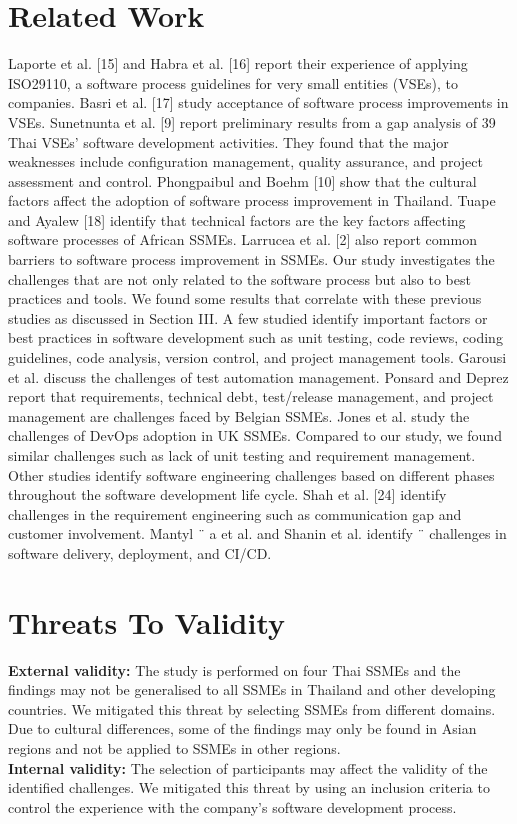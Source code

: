 \documentclass[conference]{IEEEtran}
\begin{document}
\section{Related Work}
Laporte et al. [15] and Habra et al. [16] report their experience of applying ISO29110, a software process guidelines
for very small entities (VSEs), to companies. Basri et al. [17]
study acceptance of software process improvements in VSEs.
Sunetnunta et al. [9] report preliminary results from a gap
analysis of 39 Thai VSEs’ software development activities.
They found that the major weaknesses include configuration
management, quality assurance, and project assessment and
control. Phongpaibul and Boehm [10] show that the cultural
factors affect the adoption of software process improvement
in Thailand. Tuape and Ayalew [18] identify that technical
factors are the key factors affecting software processes of
African SSMEs. Larrucea et al. [2] also report common
barriers to software process improvement in SSMEs. Our study
investigates the challenges that are not only related to the
software process but also to best practices and tools. We
found some results that correlate with these previous studies
as discussed in Section III.
A few studied identify important factors or best
practices in software development such as unit testing, code
reviews, coding guidelines, code analysis, version control, and
project management tools. Garousi et al. discuss the
challenges of test automation management. Ponsard and Deprez report that requirements, technical debt, test/release
management, and project management are challenges faced
by Belgian SSMEs. Jones et al. study the challenges
of DevOps adoption in UK SSMEs. Compared to our study,
we found similar challenges such as lack of unit testing and
requirement management.
Other studies identify software engineering challenges based
on different phases throughout the software development life
cycle. Shah et al. [24] identify challenges in the requirement engineering such as communication gap and customer
involvement. Mantyl ¨ a et al. and Shanin et al. identify ¨
challenges in software delivery, deployment, and CI/CD.

\section{Threats To Validity}
\textbf{External validity:} The study is performed on four Thai
SSMEs and the findings may not be generalised to all SSMEs
in Thailand and other developing countries. We mitigated this
threat by selecting SSMEs from different domains. Due to
cultural differences, some of the findings may only be found
in Asian regions and not be applied to SSMEs in other regions.\\
\textbf{Internal validity:} The selection of participants may affect
the validity of the identified challenges. We mitigated this
threat by using an inclusion criteria to control the experience
with the company’s software development process.
\end{document}
